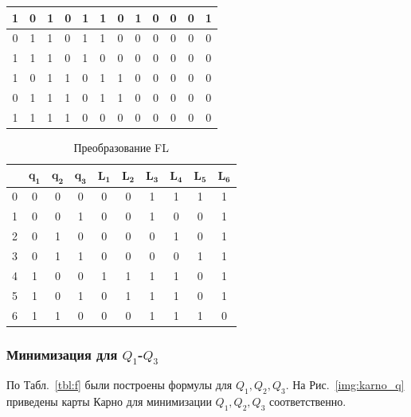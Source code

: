 \documentclass[a4paper, final]{article}
\begin{document}
\begin{table}[h!]
\begin{tabularx}{\textwidth}{|c|c|X|X|X||X|X|X|c|c|c|c|}
  1 & 0 &   1 & 0 & 1 &  1 & 0 & 1 &  0 & 0 & 0 & 1\\
  \hline
  0 & 1 &   1 & 0 & 1 &  1 & 0 & 0 &  0 & 0 & 0 & 0\\
  \hline
  1 & 1 &   1 & 0 & 1 &  0 & 0 & 0 &  0 & 0 & 0 & 0\\
  \hline

  1 & 0 &   1 & 1 & 0 &  1 & 1 & 0 &  0 & 0 & 0 & 0\\
  \hline
  0 & 1 &   1 & 1 & 0 &  1 & 1 & 0 &  0 & 0 & 0 & 0\\
  \hline
  1 & 1 &   1 & 1 & 0 &  0 & 0 & 0 &  0 & 0 & 0 & 0\\
  \hline
  \end{tabularx}
\end{table}

\begin{table}[h!]
  \centering
  \caption{Преобразование FL}
  \label{tbl:fl}
  \footnotesize
  \begin{tabular}{|c||c|c|c||c|c|c|c|c|c|}
  \hline
      & $\mathbf{q_1}$& $\mathbf{q_2}$ & $\mathbf{q_3}$ & $\mathbf{L_1}$ & $\mathbf{L_2}$ & $\mathbf{L_3}$ & $\mathbf{L_4}$ & $\mathbf{L_5}$ & $\mathbf{L_6}$ \\
  \hline
  \hline
  0   & 0 & 0 & 0   & 0 & 0 & 1 & 1 & 1 & 1 \\
  \hline
  1   & 0 & 0 & 1   & 0 & 0 & 1 & 0 & 0 & 1 \\
  \hline
  2   & 0 & 1 & 0   & 0 & 0 & 0 & 1 & 0 & 1 \\
  \hline
  3   & 0 & 1 & 1   & 0 & 0 & 0 & 0 & 1 & 1 \\
  \hline
  4   & 1 & 0 & 0   & 1 & 1 & 1 & 1 & 0 & 1 \\
  \hline
  5   & 1 & 0 & 1   & 0 & 1 & 1 & 1 & 0 & 1 \\
  \hline
  6   & 1 & 1 & 0   & 0 & 0 & 1 & 1 & 1 & 0 \\
  \hline
  \end{tabular}
\end{table}

\newpage
\subsubsection{Минимизация для $Q_1$-$Q_3$}
По Табл.~\ref{tbl:f} были построены формулы для $Q_1, Q_2, Q_3$. На Рис.~\ref{img:karno_q} приведены карты Карно для минимизации $Q_1, Q_2, Q_3$ соответственно.
\end{document}
